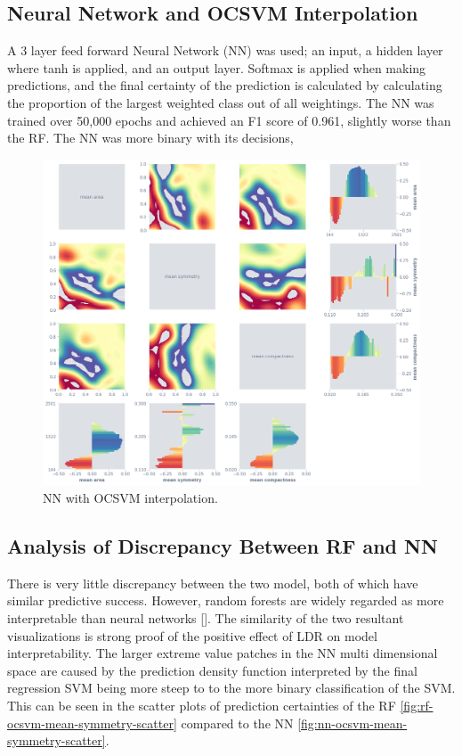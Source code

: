 \documentclass[a4paperpaper,twocolumn]{article}
\begin{document}
\subsection{Neural Network and OCSVM Interpolation}

A 3 layer feed forward Neural Network (NN) was used; an input, a hidden layer where tanh is applied, and an output layer. Softmax is applied when making predictions, and the final certainty of the prediction is calculated by calculating the proportion of the largest weighted class out of all weightings. The NN was trained over 50,000 epochs and achieved an F1 score of 0.961, slightly worse than the RF. The NN was more binary with its decisions, 

\begin{figure}
\centering
\includegraphics[width=\columnwidth]{img/nn_ocsvm_matrix.png}
\caption{NN with OCSVM interpolation.}
\label{fig:rf-ocsvm-matrix}
\end{figure}

\subsection{Analysis of Discrepancy Between RF and NN}

There is very little discrepancy between the two model, both of which have similar predictive success. However, random forests are widely regarded as more interpretable than neural networks []. The similarity of the two resultant visualizations is strong proof of the positive effect of LDR on model interpretability. The larger extreme value patches in the NN multi dimensional space are caused by the prediction density function interpreted by the final regression SVM being more steep to to the more binary classification of the SVM. This can be seen in the scatter plots of prediction certainties of the RF \ref{fig:rf-ocsvm-mean-symmetry-scatter} compared to the NN \ref{fig:nn-ocsvm-mean-symmetry-scatter}.
\end{document}
